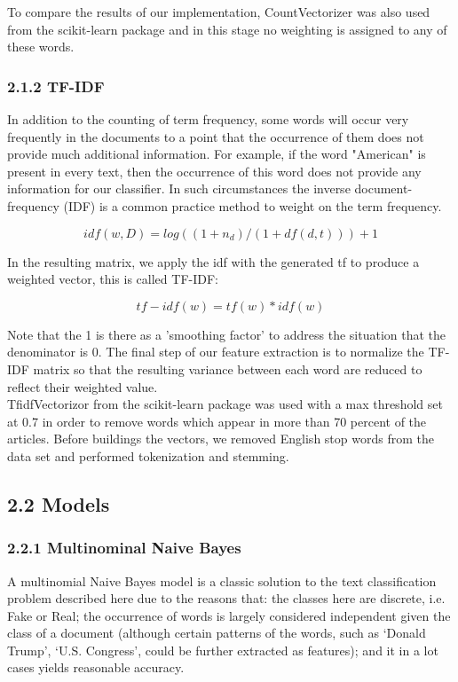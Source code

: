 \documentclass{neu_handout}
\begin{document}
To compare the results of our implementation, CountVectorizer was also used from the scikit-learn package and in this stage no weighting is assigned to any of these words.


\subsubsection*{2.1.2 TF-IDF}
In addition to the counting of term frequency, some words will occur very frequently in the documents to a point that the occurrence of them does not provide much additional information. For example, if the word "American" is present in every text, then the occurrence of this word does not provide any information for our classifier. In such circumstances the inverse document-frequency (IDF) is a common practice method to weight on the term frequency.

$$idf(w,D)=log((1+n_d)/(1+df(d,t)))+1$$

In the resulting matrix, we apply the idf with the generated tf to produce a weighted vector, this is called TF-IDF:

$$tf-idf(w)=tf(w)*idf(w)$$

Note that the 1 is there as a 'smoothing factor' to address the situation that the denominator is 0. The final step of our feature extraction is to normalize the TF-IDF matrix so that the resulting variance between each word are reduced to reflect their weighted value.\\

TfidfVectorizor from the scikit-learn package was used with a max threshold set at 0.7 in order to remove words which appear in more than 70 percent of the articles. Before buildings the vectors, we removed English stop words from the data set and performed tokenization and stemming.

\subsection*{2.2 Models}



\subsubsection*{2.2.1 Multinominal Naive Bayes}

A multinomial Naive Bayes model is a classic solution to the text classification problem described here due to the reasons that: the classes here are discrete, i.e. Fake or Real; the occurrence of words is largely considered independent given the class of a document (although certain patterns of the words, such as ‘Donald Trump’, ‘U.S. Congress’, could be further extracted as features); and it in a lot cases yields reasonable accuracy.\\
\end{document}
